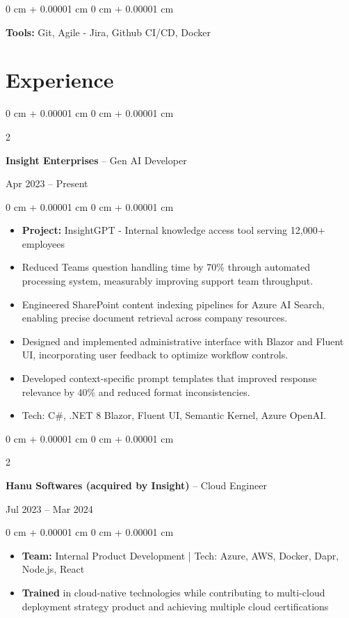 \documentclass[10pt, letterpaper]{article}
\newenvironment{highlights}{
    \begin{itemize}[
        topsep=0.10 cm,
        parsep=0.10 cm,
        partopsep=0pt,
        itemsep=0pt,
        leftmargin=0 cm + 10pt
    ]
}{
    \end{itemize}
} %
\newenvironment{onecolentry}{
    \begin{adjustwidth}{
        0 cm + 0.00001 cm
    }{
        0 cm + 0.00001 cm
    }
}{
    \end{adjustwidth}
} %
\newenvironment{twocolentry}[2][]{
    \onecolentry
    \def\secondColumn{#2}
    \setcolumnwidth{\fill, 4.5 cm}
    \begin{paracol}{2}
}{
    \switchcolumn \raggedleft \secondColumn
    \end{paracol}
    \endonecolentry
} %
\begin{document}
    \begin{onecolentry}
        \textbf{Tools: } Git, Agile - Jira, Github CI/CD, Docker
    \end{onecolentry}

    \section{Experience}

    \begin{twocolentry}{Apr 2023 – Present}
        \textbf{Insight Enterprises} -- Gen AI Developer
    \end{twocolentry}
    \begin{onecolentry}
        \begin{highlights}
            \item \textbf{Project:} InsightGPT - Internal knowledge access tool serving 12,000+ employees
            \item Reduced Teams question handling time by 70\% through automated processing system, measurably improving support team throughput.
            \item Engineered SharePoint content indexing pipelines for Azure AI Search, enabling precise document retrieval across company resources.
            \item Designed and implemented administrative interface with Blazor and Fluent UI, incorporating user feedback to optimize workflow controls.
            \item Developed context-specific prompt templates that improved response relevance by 40\% and reduced format inconsistencies.
            \item Tech: C\#, .NET 8 Blazor, Fluent UI, Semantic Kernel, Azure OpenAI.
        \end{highlights}
    \end{onecolentry}

    \vspace{0.2cm}

    \begin{twocolentry}{Jul 2023 – Mar 2024}
        \textbf{Hanu Softwares (acquired by Insight)} -- Cloud Engineer
    \end{twocolentry}
    \begin{onecolentry}
        \begin{highlights}
            \item \textbf{Team:} Internal Product Development | Tech: Azure, AWS, Docker, Dapr, Node.js, React
            \item \textbf{Trained} in cloud-native technologies while contributing to multi-cloud deployment strategy product and achieving multiple cloud certifications
        \end{highlights}
    \end{onecolentry}
\end{document}
